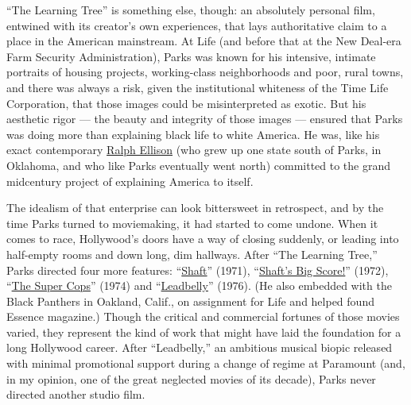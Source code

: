 ``The Learning Tree'' is something else, though: an absolutely personal
film, entwined with its creator's own experiences, that lays
authoritative claim to a place in the American mainstream. At Life (and
before that at the New Deal-era Farm Security Administration), Parks was
known for his intensive, intimate portraits of housing projects,
working-class neighborhoods and poor, rural towns, and there was always
a risk, given the institutional whiteness of the Time Life Corporation,
that those images could be misinterpreted as exotic. But his aesthetic
rigor --- the beauty and integrity of those images --- ensured that
Parks was doing more than explaining black life to white America. He
was, like his exact contemporary
\href{https://www.nytimes3xbfgragh.onion/topic/person/ralph-ellison}{Ralph
Ellison} (who grew up one state south of Parks, in Oklahoma, and who
like Parks eventually went north) committed to the grand midcentury
project of explaining America to itself.

The idealism of that enterprise can look bittersweet in retrospect, and
by the time Parks turned to moviemaking, it had started to come undone.
When it comes to race, Hollywood's doors have a way of closing suddenly,
or leading into half-empty rooms and down long, dim hallways. After
``The Learning Tree,'' Parks directed four more features:
``\href{https://www.nytimes3xbfgragh.onion/watching/titles/movies/1000012133}{Shaft}''
(1971),
``\href{https://www.nytimes3xbfgragh.onion/watching/titles/movies/1000146702}{Shaft's
Big Score!}'' (1972),
``\href{https://www.nytimes3xbfgragh.onion/watching/titles/movies/1000115487}{The
Super Cops}'' (1974) and
``\href{https://www.nytimes3xbfgragh.onion/watching/titles/movies/1000086190}{Leadbelly}''
(1976). (He also embedded with the Black Panthers in Oakland, Calif., on
assignment for Life and helped found Essence magazine.) Though the
critical and commercial fortunes of those movies varied, they represent
the kind of work that might have laid the foundation for a long
Hollywood career. After ``Leadbelly,'' an ambitious musical biopic
released with minimal promotional support during a change of regime at
Paramount (and, in my opinion, one of the great neglected movies of its
decade), Parks never directed another studio film.

